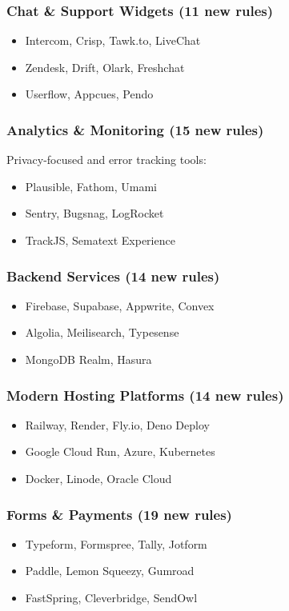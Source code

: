 \documentclass[11pt,a4paper,oneside]{article}
\begin{document}
\subsubsection{Chat \& Support Widgets (11 new rules)}
\begin{itemize}
    \item Intercom, Crisp, Tawk.to, LiveChat
    \item Zendesk, Drift, Olark, Freshchat
    \item Userflow, Appcues, Pendo
\end{itemize}

\subsubsection{Analytics \& Monitoring (15 new rules)}
Privacy-focused and error tracking tools:
\begin{itemize}
    \item Plausible, Fathom, Umami
    \item Sentry, Bugsnag, LogRocket
    \item TrackJS, Sematext Experience
\end{itemize}

\subsubsection{Backend Services (14 new rules)}
\begin{itemize}
    \item Firebase, Supabase, Appwrite, Convex
    \item Algolia, Meilisearch, Typesense
    \item MongoDB Realm, Hasura
\end{itemize}

\subsubsection{Modern Hosting Platforms (14 new rules)}
\begin{itemize}
    \item Railway, Render, Fly.io, Deno Deploy
    \item Google Cloud Run, Azure, Kubernetes
    \item Docker, Linode, Oracle Cloud
\end{itemize}

\subsubsection{Forms \& Payments (19 new rules)}
\begin{itemize}
    \item Typeform, Formspree, Tally, Jotform
    \item Paddle, Lemon Squeezy, Gumroad
    \item FastSpring, Cleverbridge, SendOwl
\end{itemize}
\end{document}
